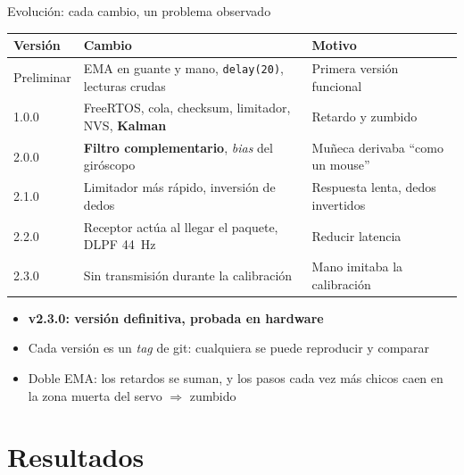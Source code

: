 \documentclass[aspectratio=169,10pt]{beamer}
\begin{document}
\begin{frame}{Evolución: cada cambio, un problema observado}
  \centering\small
  \begin{tabular}{l p{6.0cm} p{5.4cm}}
    \toprule
    \textbf{Versión} & \textbf{Cambio} & \textbf{Motivo} \\
    \midrule
    Preliminar & EMA en guante y mano, \texttt{delay(20)}, lecturas crudas & Primera versión funcional \\
    1.0.0 & FreeRTOS, cola, checksum, limitador, NVS, \textbf{Kalman} & Retardo y zumbido \\
    2.0.0 & \textbf{Filtro complementario}, \textit{bias} del giróscopo & Muñeca derivaba ``como un mouse'' \\
    2.1.0 & Limitador más rápido, inversión de dedos & Respuesta lenta, dedos invertidos \\
    2.2.0 & Receptor actúa al llegar el paquete, DLPF \SI{44}{\hertz} & Reducir latencia \\
    2.3.0 & Sin transmisión durante la calibración & Mano imitaba la calibración \\
    \bottomrule
  \end{tabular}
  \vspace{1.5ex}
  \begin{itemize}\small
    \item \textbf{v2.3.0: versión definitiva, probada en hardware}
    \item Cada versión es un \textit{tag} de git: cualquiera se puede reproducir y comparar
    \item Doble EMA: los retardos se suman, y los pasos cada vez más chicos caen en la zona muerta del servo $\Rightarrow$ zumbido
  \end{itemize}
\end{frame}

\section{Resultados}
\end{document}

